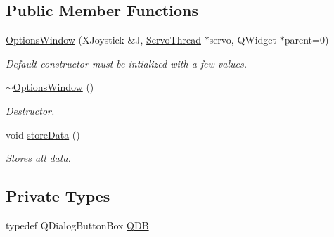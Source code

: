 \subsection*{Public Member Functions}
\begin{DoxyCompactItemize}
\item 
\hyperlink{a00006_ae8e0a610d13a0478bdac57ec7cd4afba}{Options\+Window} (X\+Joystick \&J, \hyperlink{a00009}{Servo\+Thread} $\ast$servo, Q\+Widget $\ast$parent=0)
\begin{DoxyCompactList}\small\item\em Default constructor must be intialized with a few values. \end{DoxyCompactList}\item 
\hyperlink{a00006_a034c885fe8bb4416e732a9571d14a6b4}{$\sim$\+Options\+Window} ()
\begin{DoxyCompactList}\small\item\em Destructor. \end{DoxyCompactList}\item 
void \hyperlink{a00006_ab0a56ad7347c20046602a7a2a1c83397}{store\+Data} ()
\begin{DoxyCompactList}\small\item\em Stores all data. \end{DoxyCompactList}\end{DoxyCompactItemize}
\subsection*{Private Types}
\begin{DoxyCompactItemize}
\item 
typedef Q\+Dialog\+Button\+Box \hyperlink{a00006_aadac35a91eb1992c12e4ba6c4d5ad1be}{Q\+D\+B}
\end{DoxyCompactItemize}
